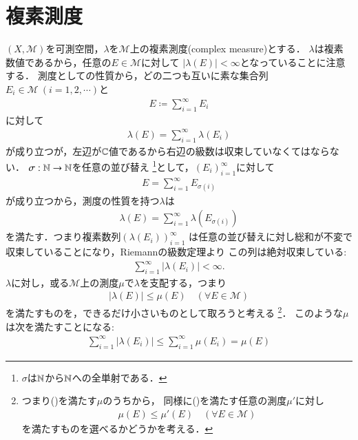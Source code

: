 \section{複素測度}
	$(X,\mathcal{M})$を可測空間，$\lambda$を$\mathcal{M}$上の複素測度(complex measure)とする．
	$\lambda$は複素数値であるから，任意の$E \in \mathcal{M}$に対して
	$|\lambda(E)| < \infty$となっていることに注意する．
	測度としての性質から，どの二つも互いに素な集合列$E_i \in \mathcal{M}\ (i=1,2,\cdots)$と
	\begin{align}
		E \coloneqq \sum_{i=1}^{\infty} E_i
	\end{align}
	に対して
	\begin{align}
		\lambda(E) = \sum_{i=1}^{\infty} \lambda(E_i)
	\end{align}
	が成り立つが，左辺が$\mathbb{C}$値であるから右辺の級数は収束していなくてはならない．
	$\sigma:\mathbb{N} \rightarrow \mathbb{N}$を任意の並び替え
	\footnote{
		$\sigma$は$\mathbb{N}$から$\mathbb{N}$への全単射である．
	}として，$(E_i)_{i=1}^{\infty}$に対して
	\begin{align}
		E = \sum_{i=1}^{\infty}E_{\sigma(i)}
	\end{align}
	が成り立つから，測度の性質を持つ$\lambda$は
	\begin{align}
		\lambda(E) = \sum_{i=1}^{\infty} \lambda(E_{\sigma(i)})
	\end{align}
	を満たす．つまり複素数列$\left( \lambda(E_i) \right)_{i=1}^{\infty}$
	は任意の並び替えに対し総和が不変で収束していることになり，Riemannの級数定理より
	この列は絶対収束している:
	\begin{align}
		\sum_{i=1}^{\infty} |\lambda(E_i)| < \infty.
	\end{align}
	$\lambda$に対し，或る$\mathcal{M}$上の測度$\mu$で$\lambda$を支配する，つまり
	\begin{align}
		|\lambda(E)| \leq \mu(E) \quad (\forall E \in \mathcal{M})
		\label{radon_nikodym_1}
	\end{align}
	を満たすものを，できるだけ小さいものとして取ろうと考える
	\footnote{
		つまり()を満たす$\mu$のうちから，
		同様に()を満たす任意の測度$\mu'$に対し
		\begin{align}
			\mu(E) \leq \mu'(E) \quad (\forall E \in \mathcal{M})
		\end{align}
		を満たすものを選べるかどうかを考える．
	}．
	このような$\mu$は次を満たすことになる:
	\begin{align}
		\sum_{i=1}^{\infty} |\lambda(E_i)| \leq \sum_{i=1}^{\infty} \mu(E_i) = \mu(E)
	\end{align}
